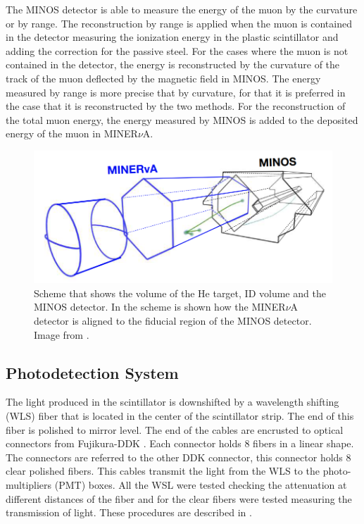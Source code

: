 The MINOS detector is able to measure the energy of the muon by the curvature or by range. The reconstruction by range is applied when the muon is contained in the detector measuring the ionization energy in the plastic scintillator and adding the correction for the passive steel. For the cases where the muon is not contained in the detector, the energy is reconstructed by the curvature of the track of the muon deflected by the magnetic field in MINOS. The energy measured by range is more precise that by curvature, for that it is preferred in the case that it is reconstructed by the two methods. For the reconstruction of the total muon energy, the energy measured by MINOS is added to the deposited energy of the muon in MINER$\nu$A. 


\begin{figure}[!htb]
    \centering
    \includegraphics[scale=0.4]{Figures/Chapter2/MnvMINOS.png}
    \caption{Scheme that shows the volume of the He target, ID volume and the MINOS detector. In the scheme is shown how the MINER$\nu$A detector is aligned to the fiducial region of the MINOS detector. Image from \cite{MarvinThesis}.}
    \label{fig:MnvExp:MnvDetector:WholeMINERvADet}
\end{figure}

\subsection{Photodetection System}
\label{Cap:MnvExp:MnvDetector:PhotoDetectionSystem}

The light produced in the scintillator is downshifted by a wavelength shifting (WLS) fiber that is located in the center of the scintillator strip. The end of this fiber is polished to mirror level. The end of the cables are encrusted to optical connectors from Fujikura-DDK \cite{OpticalConnector}. Each connector holds 8 fibers in a linear shape. The connectors are referred to the other DDK connector, this connector holds 8 clear polished fibers. This cables transmit the light from the WLS to the photo-multipliers (PMT) boxes. All the WSL were tested checking the attenuation at different distances of the fiber and for the clear fibers were tested measuring the transmission of light. These procedures are described in \cite{ALIAGA2014130}.

